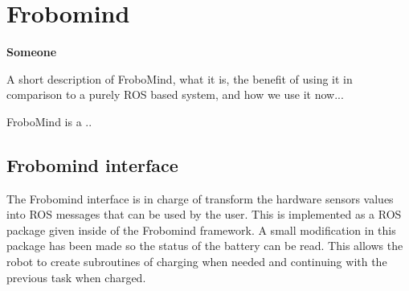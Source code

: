 \section{Frobomind} %
\label{sec:mr_frobomind}

\textbf{Someone}

A short description of FroboMind, what it is, the benefit of using it in comparison to a purely ROS based system, and how we use it now...

FroboMind is a ..

	\subsection{Frobomind interface} %
	\label{sub:mr_frobomind_interface}
	The Frobomind interface is in charge of transform the hardware sensors values into ROS messages that can be used by the user.
	This is implemented as a ROS package given inside of the Frobomind framework.
	A small modification in this package has been made so the status of the battery can be read.
	This allows the robot to create subroutines of charging when needed and continuing with the previous task when charged.

